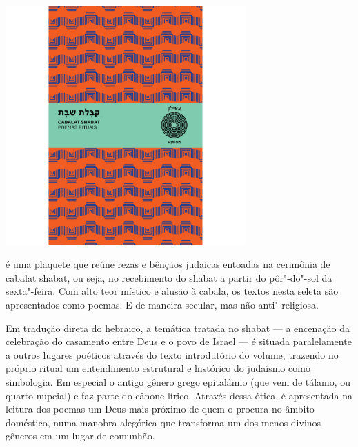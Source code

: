 \begin{center}
\hspace*{.5cm}\includegraphics[width=92mm]{./grid/cabalat.png}
\end{center}

\hspace*{-7cm}\hrulefill\hspace*{-7cm}

\medskip

 é uma plaquete que reúne rezas e bênçãos judaicas entoadas na cerimônia de cabalat shabat, ou seja, no recebimento do shabat a partir do pôr"-do"-sol da sexta"-feira. Com alto teor místico e alusão à cabala, os textos nesta seleta são apresentados como poemas. E de maneira secular, mas não anti"-religiosa.

Em tradução direta do hebraico, a temática tratada no shabat --- a encenação da celebração do casamento entre Deus e o povo de Israel --- é situada paralelamente a outros lugares poéticos através do texto introdutório do volume, trazendo no próprio ritual um entendimento estrutural e histórico do judaísmo como simbologia. Em especial o antigo gênero grego epitalâmio (que vem de tálamo, ou quarto nupcial) e faz parte do cânone lírico. Através dessa ótica, é apresentada na leitura dos poemas um Deus mais próximo de quem o procura no âmbito doméstico, numa manobra alegórica que transforma um dos menos divinos gêneros em um lugar de comunhão.


\vfill

\hspace*{-.4cm}\begin{minipage}[c]{.5\linewidth}
\small{
{}}
\end{minipage}


